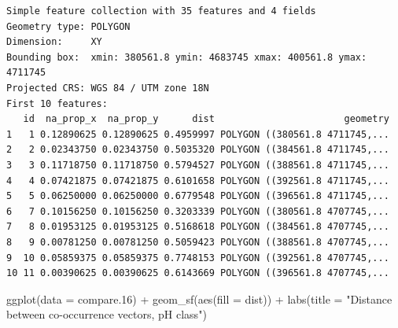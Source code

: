 \documentclass[
  letterpaper,
  DIV=11,
  numbers=noendperiod]{scrartcl}
\newenvironment{Shaded}{\begin{snugshade}}{\end{snugshade}}
\newcommand{\AttributeTok}[1]{\textcolor[rgb]{0.40,0.45,0.13}{#1}}
\newcommand{\FloatTok}[1]{\textcolor[rgb]{0.68,0.00,0.00}{#1}}
\newcommand{\FunctionTok}[1]{\textcolor[rgb]{0.28,0.35,0.67}{#1}}
\newcommand{\NormalTok}[1]{\textcolor[rgb]{0.00,0.23,0.31}{#1}}
\newcommand{\SpecialCharTok}[1]{\textcolor[rgb]{0.37,0.37,0.37}{#1}}
\newcommand{\StringTok}[1]{\textcolor[rgb]{0.13,0.47,0.30}{#1}}
\begin{document}
\begin{verbatim}
Simple feature collection with 35 features and 4 fields
Geometry type: POLYGON
Dimension:     XY
Bounding box:  xmin: 380561.8 ymin: 4683745 xmax: 400561.8 ymax: 4711745
Projected CRS: WGS 84 / UTM zone 18N
First 10 features:
   id  na_prop_x  na_prop_y      dist                       geometry
1   1 0.12890625 0.12890625 0.4959997 POLYGON ((380561.8 4711745,...
2   2 0.02343750 0.02343750 0.5035320 POLYGON ((384561.8 4711745,...
3   3 0.11718750 0.11718750 0.5794527 POLYGON ((388561.8 4711745,...
4   4 0.07421875 0.07421875 0.6101658 POLYGON ((392561.8 4711745,...
5   5 0.06250000 0.06250000 0.6779548 POLYGON ((396561.8 4711745,...
6   7 0.10156250 0.10156250 0.3203339 POLYGON ((380561.8 4707745,...
7   8 0.01953125 0.01953125 0.5168618 POLYGON ((384561.8 4707745,...
8   9 0.00781250 0.00781250 0.5059423 POLYGON ((388561.8 4707745,...
9  10 0.05859375 0.05859375 0.7748153 POLYGON ((392561.8 4707745,...
10 11 0.00390625 0.00390625 0.6143669 POLYGON ((396561.8 4707745,...
\end{verbatim}

\begin{Shaded}
\begin{Highlighting}[]
\FunctionTok{ggplot}\NormalTok{(}\AttributeTok{data =}\NormalTok{ compare}\FloatTok{.16}\NormalTok{) }\SpecialCharTok{+}
  \FunctionTok{geom\_sf}\NormalTok{(}\FunctionTok{aes}\NormalTok{(}\AttributeTok{fill =}\NormalTok{ dist)) }\SpecialCharTok{+}
  \FunctionTok{labs}\NormalTok{(}\AttributeTok{title =} \StringTok{"Distance between co{-}occurrence vectors, pH class"}\NormalTok{)}
\end{Highlighting}
\end{Shaded}
\end{document}
